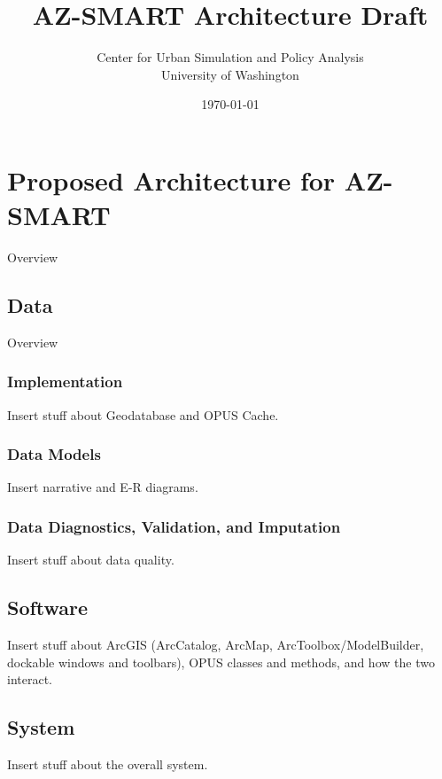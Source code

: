 \documentclass[titlepage]{article}
\begin{document}
\title{AZ-SMART Architecture Draft}
\author{Center for Urban Simulation and Policy Analysis\\University of Washington}
\date{\today}
\maketitle


\section{Proposed Architecture for AZ-SMART}
Overview

\subsection{Data}
Overview
\subsubsection{Implementation}
Insert stuff about Geodatabase and OPUS Cache.
\subsubsection{Data Models}
Insert narrative and E-R diagrams.
\subsubsection{Data Diagnostics, Validation, and Imputation}
Insert stuff about data quality.

\subsection{Software}
Insert stuff about ArcGIS (ArcCatalog, ArcMap, ArcToolbox/ModelBuilder, dockable windows and toolbars), OPUS classes and methods, and how the two interact.

\subsection{System}
Insert stuff about the overall system.
\end{document}
